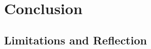 \documentclass[11pt, a4paper]{report}
\begin{document}
\


\section{Conclusion}
\subsection{Limitations and Reflection}



\newpage 

\printbibliography
\end{document}
